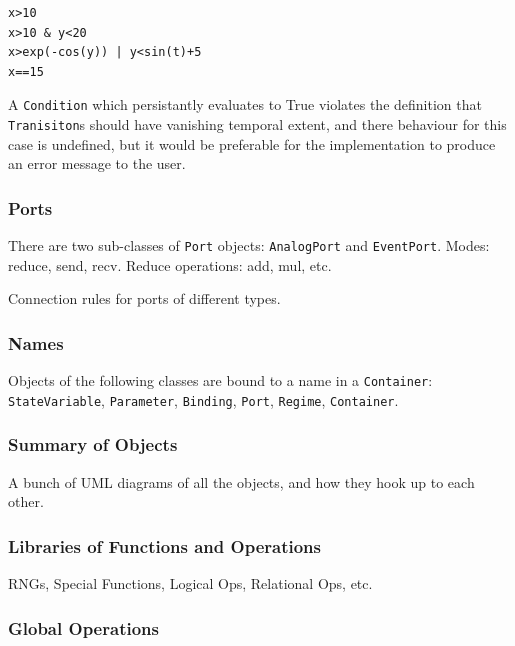 \documentclass[a4paper]{article}
\newcommand\nmlClass[1]{{\tt #1}}
\begin{document}
\begin{lstlisting}[style=display]
x>10
x>10 & y<20
x>exp(-cos(y)) | y<sin(t)+5
x==15
\end{lstlisting}

A \nmlClass{Condition} which persistantly evaluates to True
violates the definition that \nmlClass{Tranisiton}s should have vanishing
temporal extent, and there behaviour for this case is undefined, but
it would be preferable for the implementation to produce an error
message to the user.

\subsubsection{Ports}

There are two sub-classes of \nmlClass{Port} objects: \nmlClass{AnalogPort} and \nmlClass{EventPort}.
Modes: reduce, send, recv.  
Reduce operations: add, mul, etc.

Connection rules for ports of different types.


\subsubsection{Names}

Objects of the following classes are bound to a name in a \nmlClass{Container}:
\nmlClass{StateVariable}, \nmlClass{Parameter}, \nmlClass{Binding},
\nmlClass{Port}, \nmlClass{Regime}, \nmlClass{Container}.

\subsubsection{Summary of Objects}

A bunch of UML diagrams of all the objects, and how they hook up to each other.

\subsubsection{\label{nml_lib}Libraries of Functions and Operations}

RNGs, Special Functions, Logical Ops, Relational Ops, etc.

\subsubsection{Global Operations}
\end{document}
